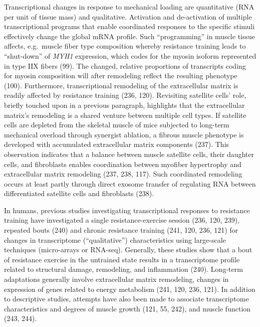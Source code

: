 \documentclass[twoside,10pt]{gihclass} %
\begin{document}
Transcriptional changes in response to mechanical loading are quantitative (RNA per unit of tissue mass) and qualitative. Activation and de-activation of multiple transcriptional programs that enable coordinated responses to the specific stimuli effectively change the global mRNA profile.
Such ``programming'' in muscle tissue affects, e.g.~muscle fiber type composition whereby resistance training leads to ``shut-down'' of \emph{MYH1} expression, which codes for the myosin isoform represented in type IIX fibers
(99).
The changed, relative proportions of transcripts coding for myosin composition will after remodeling reflect the resulting phenotype
(100).
Furthermore, transcriptional remodeling of the extracellular matrix is readily affected by resistance training
(236, 120).
Revisiting satellite cells' role, briefly touched upon in a previous paragraph, highlights that the extracellular matrix's remodeling is a shared venture between multiple cell types.
If satellite cells are depleted from the skeletal muscle of mice subjected to long-term mechanical overload through synergist ablation, a fibrous muscle phenotype is developed with accumulated extracellular matrix components
(237).
This observation indicates that a balance between muscle satellite cells, their daughter cells, and fibroblasts enables coordination between myofiber hypertrophy and extracellular matrix remodeling
(237, 238, 117).
Such coordinated remodeling occurs at least partly through direct exosome transfer of regulating RNA between differentiated satellite cells and fibroblasts
(238).

In humans, previous studies investigating transcriptional responses to resistance training have investigated a single resistance-exercise session (236, 120, 239),
repeated bouts
(240)
and chronic resistance training (241, 120, 236, 121)
for changes in transcriptome (``qualitative'') characteristics using large-scale techniques (micro-arrays or RNA-seq).
Generally, these studies show that a bout of resistance exercise in the untrained state results in a transcriptome profile related to structural damage, remodeling, and inflammation
(240).
Long-term adaptations generally involve extracellular matrix remodeling, changes in expression of genes related to energy metabolism
(241, 120, 236, 121).
In addition to descriptive studies, attempts have also been made to associate transcriptome characteristics and degrees of muscle growth
(121, 55, 242),
and muscle function
(243, 244).
\end{document}
